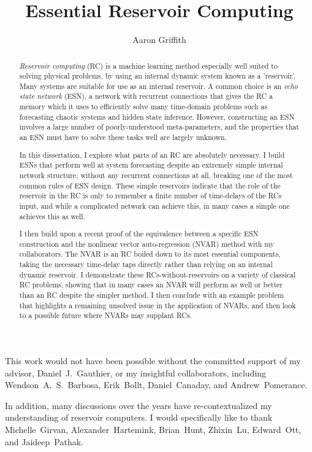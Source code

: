 \documentclass[11pt,phd]{osudiss-2}
\title{Essential Reservoir Computing}
\author{Aaron Griffith}
\begin{document}
\frontmatter

\begin{abstract}

  \emph{Reservoir computing} (RC) is a machine learning method
  especially well suited to solving physical problems, by using an
  internal dynamic system known as a 'reservoir'. Many systems are
  suitable for use as an internal reservoir. A common choice is an
  \emph{echo state network} (ESN), a network with recurrent
  connections that gives the RC a memory which it uses to efficiently
  solve many time-domain problems such as forecasting chaotic systems
  and hidden state inference. However, constructing an ESN involves a
  large number of poorly-understood meta-parameters, and the properties
  that an ESN must have to solve these tasks well are largely unknown.

  In this dissertation, I explore what parts of an RC are absolutely
  necessary. I build ESNs that perform well at system forecasting
  despite an extremely simple internal network structure, without any
  recurrent connections at all, breaking one of the most common rules
  of ESN design. These simple reservoirs indicate that the role of the
  reservoir in the RC is only to remember a finite number of
  time-delays of the RCs input, and while a complicated network can
  achieve this, in many cases a simple one achieves this as well.

  I then build upon a recent proof of the equivalence between a
  specific ESN construction and the nonlinear vector auto-regression
  (NVAR) method with my collaborators. The NVAR is an RC boiled down
  to its most essential components, taking the necessary time-delay
  taps directly rather than relying on an internal dynamic
  reservoir. I demonstrate these RCs-without-reservoirs on a variety
  of classical RC problems, showing that in many cases an NVAR will
  perform as well or better than an RC despite the simpler
  method. I then conclude with an example problem that highlights a
  remaining unsolved issue in the application of NVARs, and then look
  to a possible future where NVARs may supplant RCs.
\end{abstract}

\dedication{For my brother Nathan, and my parents Gregory and Mary Lea.}

\begin{acknowledgments}
  This work would not have been possible without the committed support
  of my advisor, \nohyphens{Daniel~J.~Gauthier}, or my insightful collaborators,
  including
  \nohyphens{Wendson~A.~S.~Barbosa},
  \nohyphens{Erik~Bollt},
  \nohyphens{Daniel~Canaday},
  and \nohyphens{Andrew~Pomerance}.

  In addition, many discussions over the years have
  re-contextualized my understanding of reservoir computers. I would
  specifically like to thank
  \nohyphens{Michelle~Girvan},
  \nohyphens{Alexander~Hartemink},
  \nohyphens{Brian~Hunt},
  \nohyphens{Zhixin~Lu},
  \nohyphens{Edward~Ott},
  and \nohyphens{Jaideep~Pathak}.
\end{acknowledgments}
\end{document}
